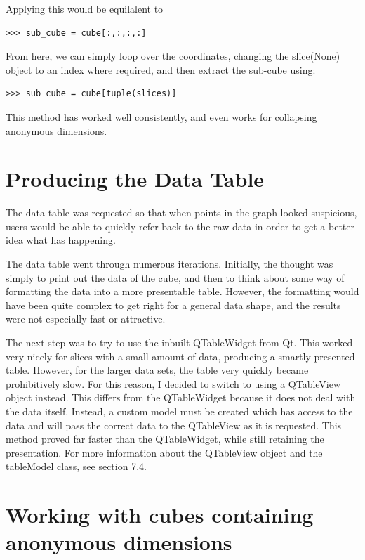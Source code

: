 \documentclass[whitecover]{MO_report}
\begin{document}
Applying this would be equilalent to

\begin{verbatim}
>>> sub_cube = cube[:,:,:,:]
\end{verbatim}

From here, we can simply loop over the coordinates, changing the slice(None)
object to an index where required, and then extract the sub-cube using:

\begin{verbatim}
>>> sub_cube = cube[tuple(slices)]
\end{verbatim}

This method has worked well consistently, and even works for collapsing
anonymous dimensions.

\section{Producing the Data Table}

The data table was requested so that when points in the graph looked suspicious,
users would be able to quickly refer back to the raw data in order to get a
better idea what has happening.

The data table went through numerous iterations. Initially, the thought was
simply to print out the data of the cube, and then to think about some way
of formatting the data into a more presentable table. However, the formatting
would have been quite complex to get right for a general data shape, and the
results were not especially fast or attractive.

The next step was to try to use the inbuilt QTableWidget from Qt. This worked
very nicely for slices with a small amount of data, producing a smartly
presented table. However, for the larger data sets, the table very quickly
became prohibitively slow. For this reason, I decided to switch to using a
QTableView object instead. This differs from the QTableWidget because it does
not deal with the data itself. Instead, a custom model must be created which
has access to the data and will pass the correct data to the QTableView as it
is requested. This method proved far faster than the QTableWidget, while still
retaining the presentation. For more information about the QTableView object
and the tableModel class, see section 7.4.

\section{Working with cubes containing anonymous dimensions}
\end{document}
